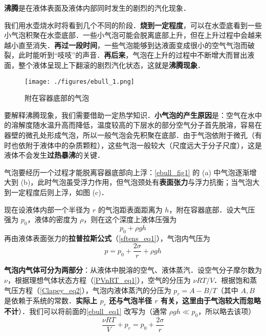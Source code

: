 
\textbf{沸腾}是在液体表面及液体内部同时发生的剧烈的汽化现象．

我们用水壶烧水时将看到几个不同的阶段．\textbf{烧到一定程度}，可以在水壶底看到一些小气泡积聚在水壶底部．一些小气泡可能会脱离底部上升，但在上升过程中会越来越小直至消失．\textbf{再过一段时间}，一些气泡能够到达液面变成很小的空气气泡而破裂，此时能听到“吱吱”的声音．\textbf{再后来}，气泡在上升的过程中不断增大而冒出液面，整个液体呈现上下翻滚的剧烈汽化状态，这就是\textbf{沸腾现象}．
\begin{figure}[ht]
\centering
\texttt{[image: ./figures/ebull\_1.png]}
\caption{附在容器底部的气泡} \label{ebull_fig1}
\end{figure}
要解释沸腾现象，我们需要借助一定热学知识．\textbf{小气泡的产生原因}是：空气在水中的溶解度随水温升高而降低，温度较高的下层水的部分空气分子首先脱溶，容易在器壁的微孔处形成气泡，所以一般气泡会先积聚在底部．由于气泡依附于微孔（有时也依附于液体中的杂质颗粒），这些气泡一般较大（尺度远大于分子尺度），这是液体不会发生\textbf{过热暴沸}的关键．

气泡要经历一个过程才能脱离容器底部向上浮：\autoref{ebull_fig1} 的 (a) 中气泡逐渐增大到 (b)，此时气泡虽受浮力作用，但气泡颈处有\textbf{表面张力}与浮力抗衡；当气泡大到一定程度后则上浮，如图 (c)．

现在设液体内部一个半径为 $r$ 的气泡距表面距离为 $h$，附在容器底部．设大气压强为 $p_0$，液体的密度为 $\rho$，则在这个深度上液体压强为
\begin{equation}
p_0+\rho gh 
\end{equation}
再由液体表面张力的\textbf{拉普拉斯公式}（\autoref{sftens_eq1}），气泡内气压为
\begin{equation}\label{ebull_eq1}
p=p_0+\frac{2\sigma}{r}+\rho gh
\end{equation}

\textbf{气泡内气体可分为两部分}：从液体中脱溶的空气、液体蒸汽．设空气分子摩尔数为 $\nu$，根据理想气体状态方程（\autoref{PVnRT_eq1}），空气的分压为 $\nu RT/V$．根据饱和蒸气压方程（\autoref{Clapey_eq2}），气泡内液体蒸汽的分压为 $p_r=A-B/T$（其中 $A,B$ 是依赖于系统的常数．\textbf{实际上 $p_r$ 还与气泡半径 $r$ 有关，这里由于气泡较大而忽略不计}）．我们可以将前面的\autoref{ebull_eq1} 改写为（通常 $\rho gh\ll p_0$，所以略去该项）
\begin{equation}\label{ebull_eq2}
\frac{\nu RT}{V}+p_r=p_0+\frac{2\sigma}{r}
\end{equation}

